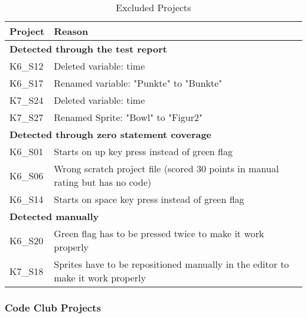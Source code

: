 \begin{table}
    \centering
    \scriptsize
    \begin{tabular}{ll}
        \toprule
        Project & Reason                                                                          \\
        \midrule
        \multicolumn{2}{l}{\textbf{Detected through the test report}}                             \\
        K6\_S12 & Deleted variable: time                                                          \\
        K6\_S17 & Renamed variable: "Punkte" to "Bunkte"                                          \\
        K7\_S24 & Deleted variable: time                                                          \\
        K7\_S27 & Renamed Sprite: "Bowl" to "Figur2"                                              \\[\medskipamount]

        \multicolumn{2}{l}{\textbf{Detected through zero statement coverage}}                     \\
        K6\_S01 & Starts on up key press instead of green flag                                    \\
        K6\_S06 & Wrong scratch project file (scored 30 points in manual rating but has no code)  \\
        K6\_S14 & Starts on space key press instead of green flag                                 \\[\medskipamount]

        \multicolumn{2}{l}{\textbf{Detected manually}}                                            \\
        K6\_S20 & Green flag has to be pressed twice to make it work properly                     \\
        K7\_S18 & Sprites have to be repositioned manually in the editor to make it work properly \\
        \bottomrule
    \end{tabular}
    \caption{Excluded Projects}
    \label{tab:excluded_projects}
\end{table}

\subsubsection{Code Club Projects}

